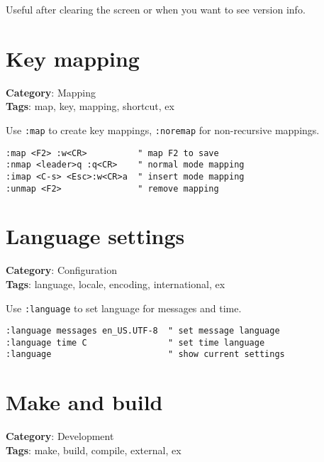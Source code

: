 {{{{{Useful after clearing the screen or when you want to see version info.

\section{Key mapping}

\textbf{Category}: Mapping\\ \textbf{Tags}: map, key, mapping, shortcut, ex
\vspace{0.5cm}

Use {\footnotesize \Verb§:map§} to create key mappings, {\footnotesize \Verb§:noremap§} for non-recursive mappings.

\begin{Exa*}{}
\begin{Verbatim}[fontsize=\footnotesize, breaklines, breakanywhere]
:map <F2> :w<CR>          " map F2 to save
:nmap <leader>q :q<CR>    " normal mode mapping
:imap <C-s> <Esc>:w<CR>a  " insert mode mapping
:unmap <F2>               " remove mapping
\end{Verbatim}
\end{Exa*}

\section{Language settings}

\textbf{Category}: Configuration\\ \textbf{Tags}: language, locale, encoding, international, ex
\vspace{0.5cm}

Use {\footnotesize \Verb§:language§} to set language for messages and time.

\begin{Exa*}{}
\begin{Verbatim}[fontsize=\footnotesize, breaklines, breakanywhere]
:language messages en_US.UTF-8  " set message language
:language time C                " set time language
:language                       " show current settings
\end{Verbatim}
\end{Exa*}

\section{Make and build}

\textbf{Category}: Development\\ \textbf{Tags}: make, build, compile, external, ex
\vspace{0.5cm}

}}}}}
